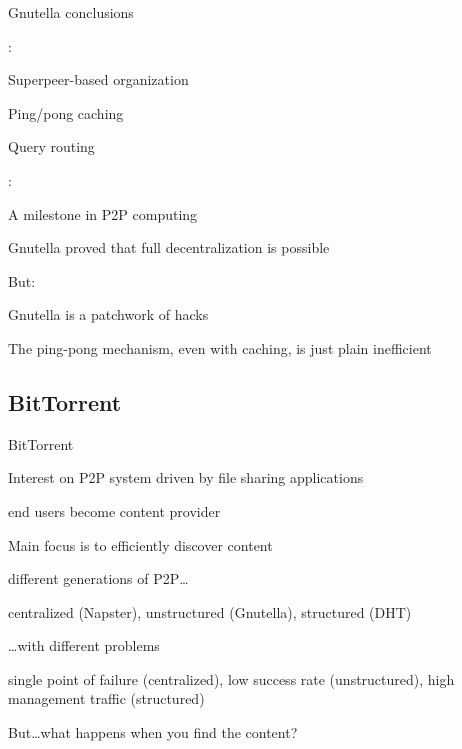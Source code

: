 \begin{frame}{Gnutella conclusions}
	
:
\BI
\item Superpeer-based organization
\item Ping/pong caching
\item Query routing
\EI

\bigskip
{}:
\BIL
\item A milestone in P2P computing
	\BI
	\item Gnutella proved that full decentralization is possible
	\EI
\item But:
	\BI
	\item Gnutella is a patchwork of hacks
	\item The ping-pong mechanism, even with caching, is just plain inefficient
	\EI	
\EIL
\end{frame}



\subsection{BitTorrent}

\begin{frame}{BitTorrent}

\BIL
\item Interest on P2P system driven by file sharing applications
	\BI
	\item end users become content provider
	\EI
\item Main focus is to efficiently discover content
	\BI
	\item different generations of P2P\ldots
		\BI 
		\item centralized (Napster), unstructured (Gnutella), structured (DHT)
		\EI
	\item \ldots with different problems
		\BI
		\item single point of failure (centralized), low success rate (unstructured), high management traffic (structured)
		\EI
	\EI
\EIL

\bigskip
But\ldots what happens when you find the content?	
	
\end{frame}

